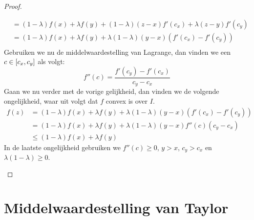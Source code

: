 \documentclass[main.tex]{subfiles}
\begin{document}
\begin{bpr}
\begin{proof}
\begin{itemize}
\[\begin{array}{rl}
        &= (1-\lambda)f(x) + \lambda f(y) + (1-\lambda)(z-x)f'(c_{x}) + \lambda(z-y)f'(c_{y})\\
        &= (1-\lambda)f(x) + \lambda f(y) + \lambda(1-\lambda)(y-x)(f'(c_{x})-f'(c_{y}))\\
      \end{array}
      \]
      Gebruiken we nu de middelwaardestelling van Lagrange, dan vinden we een $c \in \interval{c_{x}}{c_{y}}$ als volgt:
      \[ f''(c) = \frac{f'(c_{y})-f'(c_{x})}{c_{y}-c_{x}} \]
      Gaan we nu verder met de vorige gelijkheid, dan vinden we de volgende ongelijkheid, waar uit volgt dat $f$ convex is over $I$.
      \[ 
      \begin{array}{rl}
        f(z) &= (1-\lambda)f(x) + \lambda f(y) + \lambda(1-\lambda)(y-x)(f'(c_{x})-f'(c_{y}))\\
             &= (1-\lambda)f(x) + \lambda f(y) + \lambda(1-\lambda)(y-x)f''(c)(c_{y}-c_{x})\\
             &\le (1-\lambda)f(x) + \lambda f(y) 
      \end{array}
      \]
      In de laatste ongelijkheid gebruiken we $f''(c) \ge 0$, $y > x$, $c_{y}> c_{x}$ en $\lambda(1-\lambda) \ge 0$.
    \end{itemize}
  \end{proof}
\end{bpr}


\section{Middelwaardestelling van Taylor}
\label{sec:midd-van-tayl}
\end{document}
